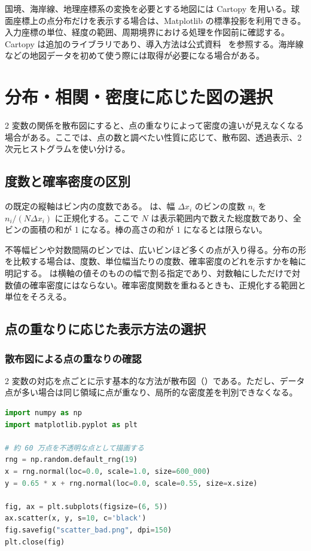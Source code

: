 国境、海岸線、地理座標系の変換を必要とする地図には Cartopy を用いる。球面座標上の点分布だけを表示する場合は、Matplotlib の標準投影を利用できる。入力座標の単位、経度の範囲、周期境界における処理を作図前に確認する。 Cartopy は追加のライブラリであり、導入方法は公式資料~\cite{cartopy_docs} を参照する。海岸線などの地図データを初めて使う際には取得が必要になる場合がある。


\section{分布・相関・密度に応じた図の選択}

2 変数の関係を散布図にすると、点の重なりによって密度の違いが見えなくなる場合がある。ここでは、点の数と調べたい性質に応じて、散布図、透過表示、2 次元ヒストグラムを使い分ける。

\subsection{度数と確率密度の区別}
 の既定の縦軸はビン内の度数である。 は、幅 \(\Delta x_i\) のビンの度数 \(n_i\) を \(n_i/(N\Delta x_i)\) に正規化する。ここで \(N\) は表示範囲内で数えた総度数であり、全ビンの面積の和が 1 になる。棒の高さの和が 1 になるとは限らない。

不等幅ビンや対数間隔のビンでは、広いビンほど多くの点が入り得る。分布の形を比較する場合は、度数、単位幅当たりの度数、確率密度のどれを示すかを軸に明記する。 は横軸の値そのものの幅で割る指定であり、対数軸にしただけで対数値の確率密度にはならない。確率密度関数を重ねるときも、正規化する範囲と単位をそろえる。

\subsection{点の重なりに応じた表示方法の選択}

\subsubsection{散布図による点の重なりの確認}

2 変数の対応を点ごとに示す基本的な方法が散布図（）である。ただし、データ点が多い場合は同じ領域に点が重なり、局所的な密度差を判別できなくなる。

\begin{lstlisting}[language=Python]
import numpy as np
import matplotlib.pyplot as plt

# 約 60 万点を不透明な点として描画する
rng = np.random.default_rng(19)
x = rng.normal(loc=0.0, scale=1.0, size=600_000)
y = 0.65 * x + rng.normal(loc=0.0, scale=0.55, size=x.size)

fig, ax = plt.subplots(figsize=(6, 5))
ax.scatter(x, y, s=10, c='black')
fig.savefig("scatter_bad.png", dpi=150)
plt.close(fig)
\end{lstlisting}

